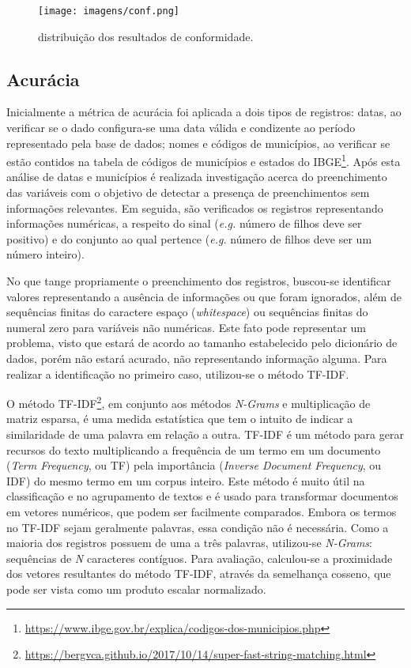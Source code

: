 \documentclass[
  12,
  table]{proadi}
\begin{document}
\begin{figure}
\centering
\texttt{[image: imagens/conf.png]}
\caption{distribuição dos resultados de conformidade.}
\end{figure}

\hypertarget{acuruxe1cia}{%
\subsection{Acurácia}\label{acuruxe1cia}}

Inicialmente a métrica de acurácia foi aplicada a dois tipos de
registros: datas, ao verificar se o dado configura-se uma data válida e
condizente ao período representado pela base de dados; nomes e códigos
de municípios, ao verificar se estão contidos na tabela de códigos de
municípios e estados do IBGE\footnote{\url{https://www.ibge.gov.br/explica/codigos-dos-municipios.php}}.
Após esta análise de datas e municípios é realizada investigação acerca
do preenchimento das variáveis com o objetivo de detectar a presença de
preenchimentos sem informações relevantes. Em seguida, são verificados
os registros representando informações numéricas, a respeito do sinal
(\emph{e.g.} número de filhos deve ser positivo) e do conjunto ao qual
pertence (\emph{e.g.} número de filhos deve ser um número inteiro).

No que tange propriamente o preenchimento dos registros, buscou-se
identificar valores representando a ausência de informações ou que foram
ignorados, além de sequências finitas do caractere espaço
(\emph{whitespace}) ou sequências finitas do numeral zero para variáveis
não numéricas. Este fato pode representar um problema, visto que estará
de acordo ao tamanho estabelecido pelo dicionário de dados, porém não
estará acurado, não representando informação alguma. Para realizar a
identificação no primeiro caso, utilizou-se o método TF-IDF.

O método TF-IDF\footnote{\url{https://bergvca.github.io/2017/10/14/super-fast-string-matching.html}},
em conjunto aos métodos \emph{N-Grams} e multiplicação de matriz
esparsa, é uma medida estatística que tem o intuito de indicar a
similaridade de uma palavra em relação a outra. TF-IDF é um método para
gerar recursos do texto multiplicando a frequência de um termo em um
documento (\emph{Term Frequency}, ou TF) pela importância (\emph{Inverse
Document Frequency}, ou IDF) do mesmo termo em um corpus inteiro. Este
método é muito útil na classificação e no agrupamento de textos e é
usado para transformar documentos em vetores numéricos, que podem ser
facilmente comparados. Embora os termos no TF-IDF sejam geralmente
palavras, essa condição não é necessária. Como a maioria dos registros
possuem de uma a três palavras, utilizou-se \emph{N-Grams}: sequências
de \emph{N} caracteres contíguos. Para avaliação, calculou-se a
proximidade dos vetores resultantes do método TF-IDF, através da
semelhança cosseno, que pode ser vista como um produto escalar
normalizado.
\end{document}
